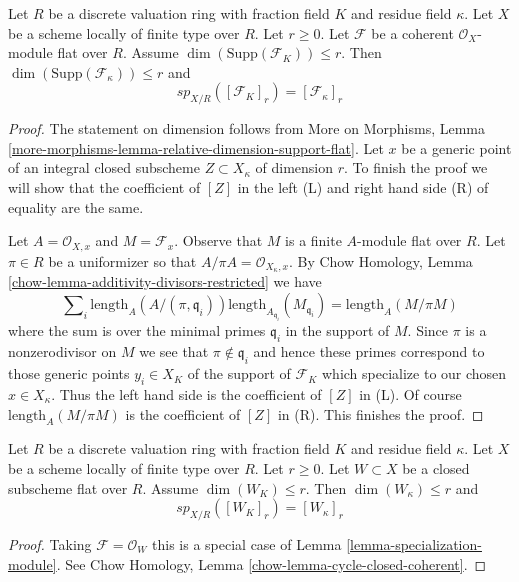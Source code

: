 \begin{lemma}
\label{lemma-specialization-module}
Let $R$ be a discrete valuation ring with fraction field $K$ and residue field
$\kappa$. Let $X$ be a scheme locally of finite type over $R$. Let $r \geq 0$.
Let $\mathcal{F}$ be a coherent $\mathcal{O}_X$-module flat over $R$. Assume
$\dim(\text{Supp}(\mathcal{F}_K)) \leq r$. Then
$\dim(\text{Supp}(\mathcal{F}_\kappa)) \leq r$ and
$$
sp_{X/R}([\mathcal{F}_K]_r) = [\mathcal{F}_\kappa]_r
$$
\end{lemma}

\begin{proof}
The statement on dimension follows from More on Morphisms, Lemma
\ref{more-morphisms-lemma-relative-dimension-support-flat}.
Let $x$ be a generic point of an integral closed subscheme
$Z \subset X_\kappa$ of dimension $r$. To finish the proof
we will show that the coefficient of $[Z]$
in the left (L) and right hand side (R) of equality are the same.

\medskip\noindent
Let $A = \mathcal{O}_{X, x}$ and $M = \mathcal{F}_x$.
Observe that $M$ is a finite $A$-module flat over $R$.
Let $\pi \in R$ be a uniformizer so that
$A/\pi A = \mathcal{O}_{X_\kappa, x}$.
By Chow Homology, Lemma \ref{chow-lemma-additivity-divisors-restricted}
we have
$$
\sum\nolimits_i \text{length}_A(A/(\pi, \mathfrak q_i))
\text{length}_{A_{\mathfrak q_i}}(M_{\mathfrak q_i}) =
\text{length}_A(M/\pi M)
$$
where the sum is over the minimal primes
$\mathfrak q_i$ in the support of $M$.
Since $\pi$ is a nonzerodivisor on $M$ we see
that $\pi \not \in \mathfrak q_i$ and hence
these primes correspond to those generic points $y_i \in X_K$ of the
support of $\mathcal{F}_K$ which specialize to our chosen $x \in X_\kappa$.
Thus the left hand side is the coefficient of $[Z]$
in (L). Of course $\text{length}_A(M/\pi M)$ is the coefficient
of $[Z]$ in (R). This finishes the proof.
\end{proof}

\begin{lemma}
\label{lemma-specialization-closed}
Let $R$ be a discrete valuation ring with fraction field $K$ and residue field
$\kappa$. Let $X$ be a scheme locally of finite type over $R$. Let $r \geq 0$.
Let $W \subset X$ be a closed subscheme flat over $R$. Assume
$\dim(W_K) \leq r$. Then $\dim(W_\kappa) \leq r$ and
$$
sp_{X/R}([W_K]_r) = [W_\kappa]_r
$$
\end{lemma}

\begin{proof}
Taking $\mathcal{F} = \mathcal{O}_W$ this is a special case of
Lemma \ref{lemma-specialization-module}. See
Chow Homology, Lemma \ref{chow-lemma-cycle-closed-coherent}.
\end{proof}

